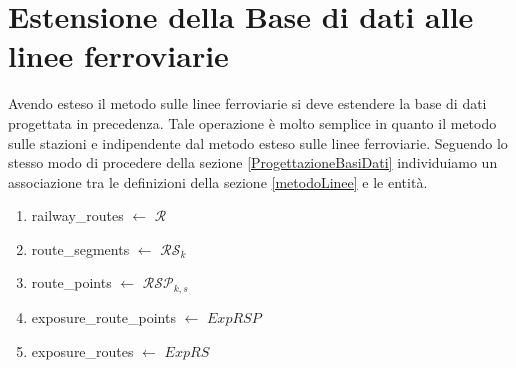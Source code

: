
\chapter{Estensione della Base di dati alle linee ferroviarie} 
Avendo esteso il metodo sulle linee ferroviarie si deve estendere la base di dati 
progettata in precedenza. Tale operazione è molto semplice in quanto il metodo sulle stazioni e indipendente dal metodo esteso sulle linee ferroviarie.
Seguendo lo stesso modo di procedere della sezione \ref{ProgettazioneBasiDati} 
individuiamo un associazione tra le definizioni della sezione \ref{metodoLinee}
e le entità.
\begin{enumerate}
	\item railway\_routes $\leftarrow$ $\mathcal{R}$
	\item route\_segments $\leftarrow$ $\mathcal{RS}_k$
	\item route\_points $\leftarrow$ $\mathcal{RSP}_{k,s}$
	\item exposure\_route\_points $\leftarrow$ $ExpRSP$
	\item exposure\_routes $\leftarrow$ $ExpRS$
	
\end{enumerate}

